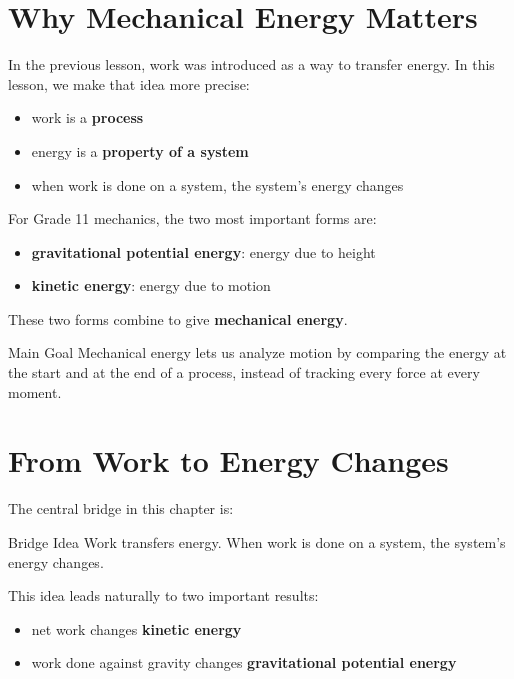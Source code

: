 



\maketitle

\section{Why Mechanical Energy Matters}
In the previous lesson, work was introduced as a way to transfer energy. In this lesson, we make that idea more precise:
\begin{itemize}
    \item work is a \textbf{process}
    \item energy is a \textbf{property of a system}
    \item when work is done on a system, the system's energy changes
\end{itemize}

For Grade 11 mechanics, the two most important forms are:
\begin{itemize}
    \item \textbf{gravitational potential energy}: energy due to height
    \item \textbf{kinetic energy}: energy due to motion
\end{itemize}

These two forms combine to give \textbf{mechanical energy}.

\begin{keyidea}{Main Goal}
Mechanical energy lets us analyze motion by comparing the energy at the start and at the end of a process, instead of tracking every force at every moment.
\end{keyidea}

\section{From Work to Energy Changes}
The central bridge in this chapter is:

\begin{keyidea}{Bridge Idea}
Work transfers energy. When work is done on a system, the system's energy changes.
\end{keyidea}

This idea leads naturally to two important results:
\begin{itemize}
    \item net work changes \textbf{kinetic energy}
    \item work done against gravity changes \textbf{gravitational potential energy}
\end{itemize}

